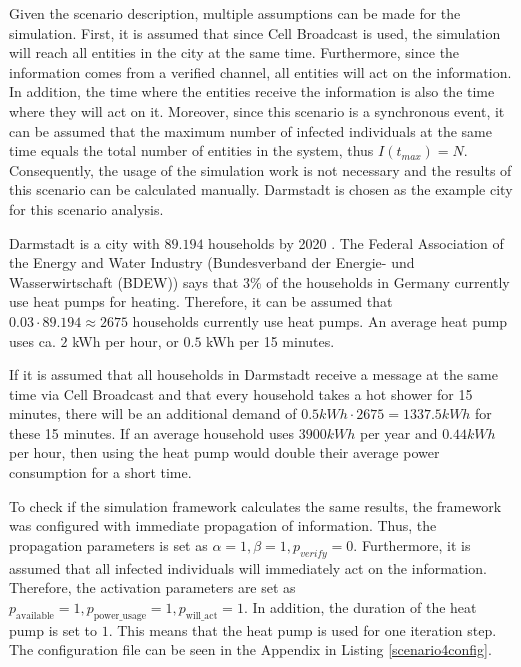 Given the scenario description, multiple assumptions can be
made for the simulation.
First, it is assumed that since Cell Broadcast is used, the simulation
will reach all entities in the city at the same time.
Furthermore, since the information comes from a verified channel,
all entities will act on the information. In addition, the time where the
entities receive the information is also the time where they will act
on it.
Moreover, since this scenario is a synchronous event, it can be 
assumed that the
maximum number of infected individuals at the same time equals
the total number of entities in the system, thus $I(t_{max})=N$.
Consequently, the usage of the simulation work is not necessary
and the results of this scenario can be calculated manually.
Darmstadt is chosen as the example city for this scenario analysis.

Darmstadt is a city with $89.194$ households by 2020 
\cite{statistadarmstadt}. The 
Federal Association of the Energy and Water Industry
(Bundesverband der Energie- und Wasserwirtschaft (BDEW)) 
says that $3\%$ of the households in Germany currently use
heat pumps for heating. Therefore, it can be assumed that 
$0.03 \cdot 89.194 \approx 2675$ households currently use 
heat pumps. An average heat pump uses ca. $2$ kWh per hour, 
or $0.5$ kWh per 15 minutes.

If it is assumed that all households in Darmstadt receive 
a message at the same time via Cell Broadcast and that
every household takes a hot shower for 15 minutes,
there will be an additional 
demand of $0.5kWh \cdot 2675 = 1337.5 kWh $ for these 
15 minutes. If an average household uses $3900 kWh$ 
per year and $0.44kWh$ per hour, then using the heat pump 
would double their average power consumption for a short time.

To check if the simulation framework calculates the same 
results, the framework was configured with immediate
propagation of information. Thus, the propagation
parameters is set as 
$\alpha=1, \beta=1, p_{verify}=0$. 
Furthermore, it is assumed that all infected 
individuals will immediately act on the information.
Therefore, the activation parameters are 
set as $p_{\mathrm{available}}=1, 
p_{\mathrm{power\_usage}}=1, p_{\mathrm{will\_act}}=1$.
In addition, the duration of the heat pump is set to $1$.
This means that the heat pump is used for one iteration step.
The configuration file can be seen in the Appendix in
Listing \ref{scenario4config}.


